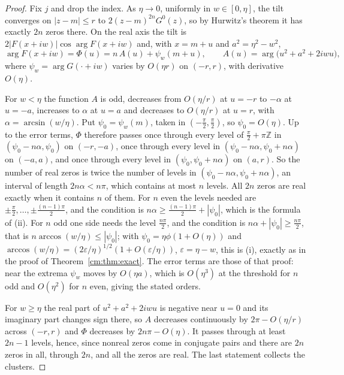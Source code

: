 \begin{proof}
Fix $j$ and drop the index. As $\eta\to0$, uniformly in $w\in[0,\eta]$, the tilt converges on $|z-m|\le r$ to $2(z-m)^{2n}G^0(z)$, so by Hurwitz's theorem it has exactly $2n$ zeros there. On the real axis the tilt is $2|F(x+iw)|\cos\arg F(x+iw)$ and, with $x=m+u$ and $a^2=\eta^2-w^2$,
\[
\arg F(x+iw)=\Phi(u)=n\,A(u)+\psi_w(m+u),\qquad A(u)=\arg\big(u^2+a^2+2iwu\big),
\]
where $\psi_w=\arg G(\cdot+iw)$ varies by $O(\eta r)$ on $(-r,r)$, with derivative $O(\eta)$.

For $w<\eta$ the function $A$ is odd, decreases from $O(\eta/r)$ at $u=-r$ to $-\alpha$ at $u=-a$, increases to $\alpha$ at $u=a$ and decreases to $O(\eta/r)$ at $u=r$, with $\alpha=\arcsin(w/\eta)$. Put $\psi_0=\psi_w(m)$, taken in $(-\frac\pi2,\frac\pi2)$, so $\psi_0=O(\eta)$. Up to the error terms, $\Phi$ therefore passes once through every level of $\frac\pi2+\pi\mathbb Z$ in $(\psi_0-n\alpha,\psi_0)$ on $(-r,-a)$, once through every level in $(\psi_0-n\alpha,\psi_0+n\alpha)$ on $(-a,a)$, and once through every level in $(\psi_0,\psi_0+n\alpha)$ on $(a,r)$. So the number of real zeros is twice the number of levels in $(\psi_0-n\alpha,\psi_0+n\alpha)$, an interval of length $2n\alpha<n\pi$, which contains at most $n$ levels. All $2n$ zeros are real exactly when it contains $n$ of them. For $n$ even the levels needed are $\pm\frac\pi2,\dots,\pm\frac{(n-1)\pi}2$, and the condition is $n\alpha\ge\frac{(n-1)\pi}2+|\psi_0|$, which is the formula of (ii). For $n$ odd one side needs the level $\frac{n\pi}2$, and the condition is $n\alpha+|\psi_0|\ge\frac{n\pi}2$, that is $n\arccos(w/\eta)\le|\psi_0|$; with $\psi_0=\eta\phi(1+O(\eta))$ and $\arccos(w/\eta)=(2\varepsilon/\eta)^{1/2}(1+O(\varepsilon/\eta))$, $\varepsilon=\eta-w$, this is (i), exactly as in the proof of Theorem~\ref{cm:thm:exact}. The error terms are those of that proof: near the extrema $\psi_w$ moves by $O(\eta a)$, which is $O(\eta^3)$ at the threshold for $n$ odd and $O(\eta^2)$ for $n$ even, giving the stated orders.

For $w\ge\eta$ the real part of $u^2+a^2+2iwu$ is negative near $u=0$ and its imaginary part changes sign there, so $A$ decreases continuously by $2\pi-O(\eta/r)$ across $(-r,r)$ and $\Phi$ decreases by $2n\pi-O(\eta)$. It passes through at least $2n-1$ levels, hence, since nonreal zeros come in conjugate pairs and there are $2n$ zeros in all, through $2n$, and all the zeros are real. The last statement collects the clusters.
\end{proof}

